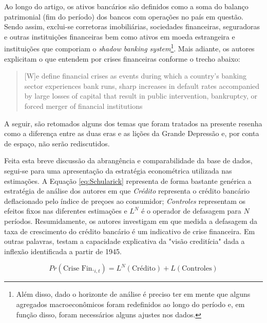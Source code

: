 \documentclass[11pt]{article}
\begin{document}
Ao longo do artigo, os ativos bancários são definidos como a soma do balanço patrimonial (fim do período) dos bancos com operações no país em questão.
Sendo assim, exclui-se corretoras imobiliárias, sociedades financeiras, seguradoras e outras instituições financeiras bem como ativos em moeda estrangeira e instituições que comporiam o \emph{shadow banking system}\footnote{Além disso, dado o horizonte de análise é preciso ter em mente que alguns agregados macroeconômicos foram redefinidos ao longo do período e, em função disso, foram necessários alguns ajustes nos dados.}.
Mais adiante, os autores explicitam o que entendem por crises financeiras conforme o trecho abaixo:

\begin{quote}
[W]e define financial crises as events during which a country’s banking sector experiences bank runs, sharp increases in default rates accompanied by large losses of capital that result in public intervention, bankruptcy, or forced merger of financial institutions \cite[p. 138]{schularickCreditBoomsGone2012}
\end{quote}
A seguir, são retomados alguns dos temas que foram tratados na presente resenha como a diferença entre as duas eras e as lições da Grande Depressão e, por conta de espaço, não serão rediscutidos.


Feita esta breve discussão da abrangência e comparabilidade da base de dados, segui-se para uma apresentação da estratégia econométrica utilizada nas estimações.
A Equação \ref{eq:Schularick} representa de forma bastante genérica a estratégia de análise dos autores em que \emph{Crédito} representa o crédito bancário deflacionado pelo índice de preçoes ao consumidor; \emph{Controles} representam os efeitos fixos nas diferentes estimações e \(L^{N}\) é o operador de defasagem para \(N\) períodos.
Resumidamente, os autores investigam em que medida a defasagem da taxa de crescimento do crédito bancário é um indicativo de crise financeira.
Em outras palavras, testam a capacidade explicativa da "visão creditícia" dada a inflexão identificada a partir de 1945.


\begin{equation}
\label{eq:Schularick}
Pr(\text{Crise Fin.}_{i,t}) = L^{N}(\text{Crédito}) + L(\text{Controles})
\end{equation}
\end{document}
